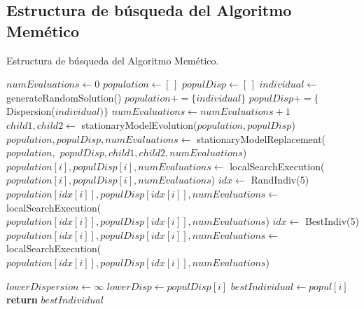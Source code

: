 \subsection{Estructura de búsqueda del Algoritmo Memético}
\begin{algorithm}[H]
    \caption{Estructura de búsqueda del Algoritmo Memético.}
\begin{algorithmic}
    \State $numEvaluations \leftarrow 0$
    \State $population \leftarrow [ \, ]$
    \State $populDisp \leftarrow [ \, ]$
     
        \State $individual \leftarrow$ generateRandomSolution()
        \State $population += \{individual\}$
        \State $populDisp += \{$Dispersion($individual)\}$
        \State $numEvaluations \leftarrow numEvaluations + 1$
    \EndFor
    \State
        \State $child1, child2 \leftarrow$ stationaryModelEvolution($population, populDisp$)
        \State
        \State $population, populDisp, numEvaluations \leftarrow$ stationaryModelReplacement($population,$
        \State $populDisp, child1, child2, numEvaluations$)
    \EndWhile
    \State
                \State $population[i], populDisp[i], numEvaluations \leftarrow$
                \State localSearchExecution($population[i], populDisp[i], numEvaluations$)
            \EndFor
            \State
            \State $idx \leftarrow$ RandIndiv(5) 
                \State $population[idx[i]], populDisp[idx[i]], numEvaluations \leftarrow$
                \State localSearchExecution($population[idx[i]], populDisp[idx[i]], numEvaluations$)
            \EndFor
            \State
            \State $idx \leftarrow$ BestIndiv(5) 
                \State $population[idx[i]], populDisp[idx[i]], numEvaluations \leftarrow$
                \State localSearchExecution($population[idx[i]], populDisp[idx[i]], numEvaluations$)
            \EndFor
        \EndIf
    \EndIf
{}
\end{algorithmic}
\end{algorithm}

\begin{algorithm}[H]
\begin{algorithmic}
    \State
    \State $lowerDispersion \leftarrow \infty$
            \State $lowerDisp \leftarrow populDisp[i]$
            \State $bestIndividual \leftarrow popul[i]$
        \EndIf
    \EndFor
    \State \textbf{return} $bestIndividual$
\EndProcedure
\end{algorithmic}
\end{algorithm}


